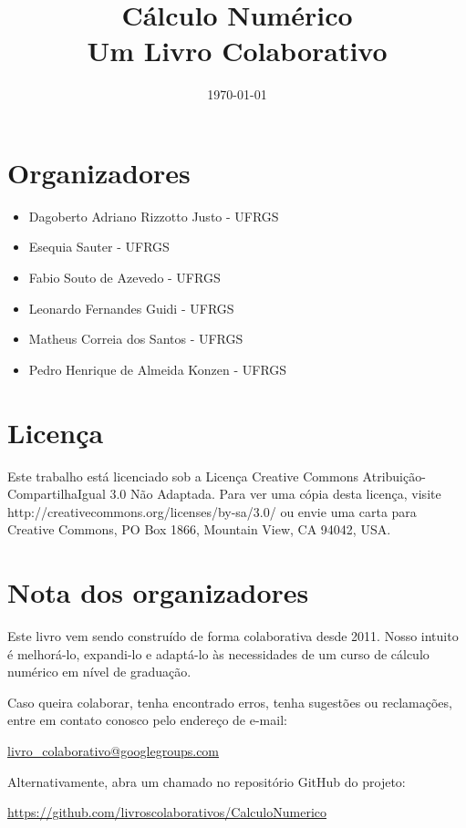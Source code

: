 \documentclass[12pt]{book}
\begin{document}
\frontmatter

\title{Cálculo Numérico\\\small{Um Livro Colaborativo}}
\author{}
\date{\today}

\ifishtml
\else
\AddToShipoutPicture*{\BackgroundPic}
\fi
\maketitle

\chapter*{Organizadores}

\begin{itemize}
\item[] Dagoberto Adriano Rizzotto Justo - UFRGS
\item[] Esequia Sauter - UFRGS
\item[] Fabio Souto de Azevedo - UFRGS
\item[] Leonardo Fernandes Guidi - UFRGS
\item[] Matheus Correia dos Santos - UFRGS
\item[] Pedro Henrique de Almeida Konzen - UFRGS
\end{itemize}

\chapter*{Licença}

Este trabalho está licenciado sob a Licença Creative Commons Atribuição-CompartilhaIgual 3.0 Não Adaptada. Para ver uma cópia desta licença, visite http://creativecommons.org/licenses/by-sa/3.0/ ou envie uma carta para Creative Commons, PO Box 1866, Mountain View, CA 94042, USA.
 
\chapter*{Nota dos organizadores}

Este livro vem sendo construído de forma colaborativa desde 2011. Nosso intuito é melhorá-lo, expandi-lo e adaptá-lo às necessidades de um curso de cálculo numérico em nível de graduação.

Caso queira colaborar, tenha encontrado erros, tenha sugestões ou reclamações, entre em contato conosco pelo endereço de e-mail:
\begin{center}
\url{livro_colaborativo@googlegroups.com}  
\end{center}
Alternativamente, abra um chamado no repositório GitHub do projeto:
\begin{center}
\url{https://github.com/livroscolaborativos/CalculoNumerico}  
\end{center}
\end{document}
